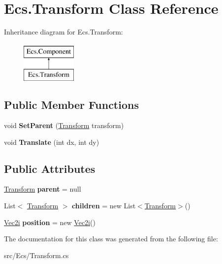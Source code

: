 \hypertarget{class_ecs_1_1_transform}{}\section{Ecs.\+Transform Class Reference}
\label{class_ecs_1_1_transform}
Inheritance diagram for Ecs.\+Transform\+:\begin{figure}[H]
\begin{center}
\leavevmode
\includegraphics[height=2.000000cm]{class_ecs_1_1_transform}
\end{center}
\end{figure}
\subsection*{Public Member Functions}
\begin{DoxyCompactItemize}
\item 
\mbox{\label{class_ecs_1_1_transform_ade54f8a35651662e0e91360effc3a052}} 
void {\bfseries Set\+Parent} (\mbox{\hyperlink{class_ecs_1_1_transform}{Transform}} transform)
\item 
\mbox{\label{class_ecs_1_1_transform_a2f303a5ea45c21cd198f3d11ec6cfe32}} 
void {\bfseries Translate} (int dx, int dy)
\end{DoxyCompactItemize}
\subsection*{Public Attributes}
\begin{DoxyCompactItemize}
\item 
\mbox{\label{class_ecs_1_1_transform_a0bfde38740639bf3e01b4a1d6029c7d6}} 
\mbox{\hyperlink{class_ecs_1_1_transform}{Transform}} {\bfseries parent} = null
\item 
\mbox{\label{class_ecs_1_1_transform_a0f95eb68f151048d53a81c02551764da}} 
List$<$ \mbox{\hyperlink{class_ecs_1_1_transform}{Transform}} $>$ {\bfseries children} = new List$<$\mbox{\hyperlink{class_ecs_1_1_transform}{Transform}}$>$()
\item 
\mbox{\label{class_ecs_1_1_transform_a686a025cfea0490a5e5f43c5ba968dfc}} 
\mbox{\hyperlink{class_ecs_1_1_vec2i}{Vec2i}} {\bfseries position} = new \mbox{\hyperlink{class_ecs_1_1_vec2i}{Vec2i}}()
\end{DoxyCompactItemize}


The documentation for this class was generated from the following file\+:\begin{DoxyCompactItemize}
\item 
src/\+Ecs/Transform.\+cs\end{DoxyCompactItemize}
